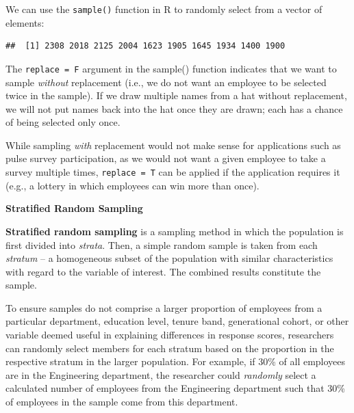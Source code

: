 \documentclass[
]{book}
\newenvironment{Shaded}{\begin{snugshade}}{\end{snugshade}}
\newcommand{\AttributeTok}[1]{\textcolor[rgb]{0.77,0.63,0.00}{#1}}
\newcommand{\CommentTok}[1]{\textcolor[rgb]{0.56,0.35,0.01}{\textit{#1}}}
\newcommand{\DecValTok}[1]{\textcolor[rgb]{0.00,0.00,0.81}{#1}}
\newcommand{\FunctionTok}[1]{\textcolor[rgb]{0.00,0.00,0.00}{#1}}
\newcommand{\NormalTok}[1]{#1}
\newcommand{\OtherTok}[1]{\textcolor[rgb]{0.56,0.35,0.01}{#1}}
\newcommand{\SpecialCharTok}[1]{\textcolor[rgb]{0.00,0.00,0.00}{#1}}
\newcommand{\StringTok}[1]{\textcolor[rgb]{0.31,0.60,0.02}{#1}}
\begin{document}
We can use the \texttt{sample()} function in R to randomly select from a vector of elements:

\begin{Shaded}
\end{Shaded}

\begin{verbatim}
##  [1] 2308 2018 2125 2004 1623 1905 1645 1934 1400 1900
\end{verbatim}

The \texttt{replace\ =\ F} argument in the sample() function indicates that we want to sample \emph{without} replacement (i.e., we do not want an employee to be selected twice in the sample). If we draw multiple names from a hat without replacement, we will not put names back into the hat once they are drawn; each has a chance of being selected only once.

While sampling \emph{with} replacement would not make sense for applications such as pulse survey participation, as we would not want a given employee to take a survey multiple times, \texttt{replace\ =\ T} can be applied if the application requires it (e.g., a lottery in which employees can win more than once).

\textbf{Stratified Random Sampling}

\textbf{Stratified random sampling} is a sampling method in which the population is first divided into \emph{strata}. Then, a simple random sample is taken from each \emph{stratum} -- a homogeneous subset of the population with similar characteristics with regard to the variable of interest. The combined results constitute the sample.

To ensure samples do not comprise a larger proportion of employees from a particular department, education level, tenure band, generational cohort, or other variable deemed useful in explaining differences in response scores, researchers can randomly select members for each stratum based on the proportion in the respective stratum in the larger population. For example, if 30\% of all employees are in the Engineering department, the researcher could \emph{randomly} select a calculated number of employees from the Engineering department such that 30\% of employees in the sample come from this department.
\end{document}
